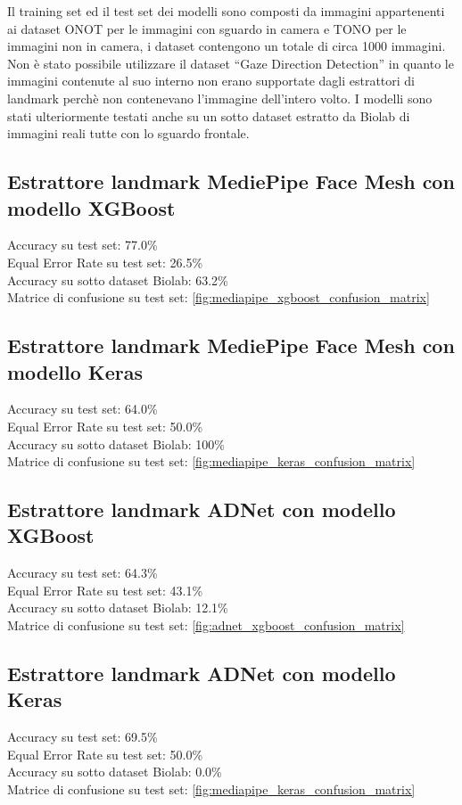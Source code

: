 \documentclass[12pt,a4paper,openright,twoside]{book}
\begin{document}
Il training set ed il test set dei modelli sono composti da immagini appartenenti ai dataset ONOT per le immagini con sguardo in camera e TONO per le immagini non in camera, i dataset contengono un totale di circa 1000 immagini. Non è stato possibile utilizzare il dataset ``Gaze Direction Detection'' in quanto le immagini contenute al suo interno non erano supportate dagli estrattori di landmark perchè non contenevano l'immagine dell'intero volto. I modelli sono stati ulteriormente testati anche su un sotto dataset estratto da Biolab di immagini reali tutte con lo sguardo frontale.

\subsection{Estrattore landmark MediePipe Face Mesh con modello XGBoost}
Accuracy su test set: 77.0\% \\
Equal Error Rate su test set: 26.5\% \\
Accuracy su sotto dataset Biolab: 63.2\% \\
Matrice di confusione su test set: \cref{fig:mediapipe_xgboost_confusion_matrix}

\subsection{Estrattore landmark MediePipe Face Mesh con modello Keras}
Accuracy su test set: 64.0\% \\
Equal Error Rate su test set: 50.0\% \\
Accuracy su sotto dataset Biolab: 100\% \\
Matrice di confusione su test set: \cref{fig:mediapipe_keras_confusion_matrix}

\subsection{Estrattore landmark ADNet con modello XGBoost}
Accuracy su test set: 64.3\% \\
Equal Error Rate su test set: 43.1\% \\
Accuracy su sotto dataset Biolab: 12.1\% \\
Matrice di confusione su test set: \cref{fig:adnet_xgboost_confusion_matrix}

\subsection{Estrattore landmark ADNet con modello Keras}
Accuracy su test set: 69.5\% \\
Equal Error Rate su test set: 50.0\% \\
Accuracy su sotto dataset Biolab: 0.0\% \\
Matrice di confusione su test set: \cref{fig:mediapipe_keras_confusion_matrix}
\end{document}
